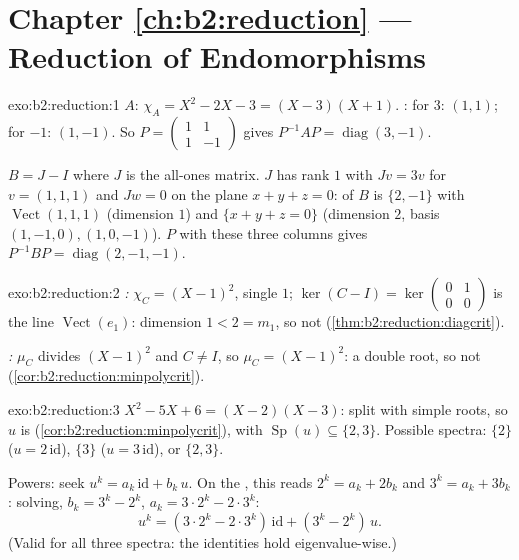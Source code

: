 \section*{Chapter \ref{ch:b2:reduction} --- Reduction of Endomorphisms}

\begin{solution}{exo:b2:reduction:1}
$A$: $\chi_A = X^2 - 2X - 3 = (X - 3)(X + 1)$. : for
$3$: $(1,1)$; for $-1$: $(1,-1)$. So $P = \begin{pmatrix} 1 & 1\\ 1
& -1\end{pmatrix}$ gives $P^{-1}AP = \operatorname{diag}(3, -1)$.

$B = J - I$ where $J$ is the all-ones matrix. $J$ has rank $1$ with
$Jv = 3v$ for $v = (1,1,1)$ and $Jw = 0$ on the plane $x + y + z =
0$:  of $B$ is $\{2, -1\}$ with 
$\operatorname{Vect}(1,1,1)$ (dimension $1$) and $\{x + y + z = 0\}$
(dimension $2$, basis $(1,-1,0), (1,0,-1)$). $P$ with these three
columns gives $P^{-1}BP = \operatorname{diag}(2, -1, -1)$.
\end{solution}

\begin{solution}{exo:b2:reduction:2}
\emph{:} $\chi_C = (X-1)^2$, single  $1$;
$\ker(C - I) = \ker\begin{pmatrix} 0&1\\ 0&0\end{pmatrix}$ is the
line $\operatorname{Vect}(e_1)$: dimension $1 < 2 = m_1$, so not
 (\cref{thm:b2:reduction:diagcrit}).

\emph{:} $\mu_C$ divides $(X-1)^2$ and $C \neq I$,
so $\mu_C = (X-1)^2$: a double root, so not 
(\cref{cor:b2:reduction:minpolycrit}).
\end{solution}

\begin{solution}{exo:b2:reduction:3}
$X^2 - 5X + 6 = (X-2)(X-3)$: split with simple roots, so $u$ is
 (\cref{cor:b2:reduction:minpolycrit}), with
$\operatorname{Sp}(u) \subseteq \{2, 3\}$. Possible spectra:
$\{2\}$ ($u = 2\,\mathrm{id}$), $\{3\}$ ($u = 3\,\mathrm{id}$), or
$\{2, 3\}$.

Powers: seek $u^k = a_k\,\mathrm{id} + b_k\,u$. On the ,
this reads $2^k = a_k + 2b_k$ and $3^k = a_k + 3b_k$: solving, $b_k
= 3^k - 2^k$, $a_k = 3\cdot2^k - 2\cdot 3^k$:
\[
u^k = (3\cdot 2^k - 2\cdot 3^k)\,\mathrm{id} + (3^k - 2^k)\, u .
\]
(Valid for all three spectra: the identities hold eigenvalue-wise.)
\end{solution}

